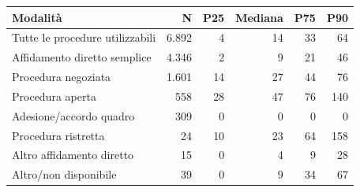 \begin{tabular}{lrrrrr}
\toprule
Modalità & N & P25 & Mediana & P75 & P90 \\
\midrule
Tutte le procedure utilizzabili & 6.892 & 4 & 14 & 33 & 64 \\
Affidamento diretto semplice & 4.346 & 2 & 9 & 21 & 46 \\
Procedura negoziata & 1.601 & 14 & 27 & 44 & 76 \\
Procedura aperta & 558 & 28 & 47 & 76 & 140 \\
Adesione/accordo quadro & 309 & 0 & 0 & 0 & 0 \\
Procedura ristretta & 24 & 10 & 23 & 64 & 158 \\
Altro affidamento diretto & 15 & 0 & 4 & 9 & 28 \\
Altro/non disponibile & 39 & 0 & 9 & 34 & 67 \\
\bottomrule
\end{tabular}
